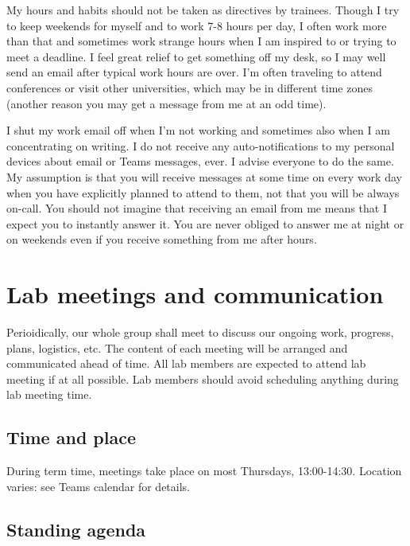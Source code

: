 \documentclass[
  12pt,
]{book}
\begin{document}
My hours and habits should not be taken as directives by trainees. Though I try to keep weekends for myself and to work 7-8 hours per day, I often work more than that and sometimes work strange hours when I am inspired to or trying to meet a deadline. I feel great relief to get something off my desk, so I may well send an email after typical work hours are over. I'm often traveling to attend conferences or visit other universities, which may be in different time zones (another reason you may get a message from me at an odd time).

I shut my work email off when I'm not working and sometimes also when I am concentrating on writing. I do not receive any auto-notifications to my personal devices about email or Teams messages, ever. I advise everyone to do the same. My assumption is that you will receive messages at some time on every work day when you have explicitly planned to attend to them, not that you will be always on-call. You should not imagine that receiving an email from me means that I expect you to instantly answer it. You are never obliged to answer me at night or on weekends even if you receive something from me after hours.

\chapter{Lab meetings and communication}\label{lab-meetings-and-communication}

Perioidically, our whole group shall meet to discuss our ongoing work, progress, plans, logistics, etc. The content of each meeting will be arranged and communicated ahead of time. All lab members are expected to attend lab meeting if at all possible. Lab members should avoid scheduling anything during lab meeting time.

\section{Time and place}\label{time-and-place}

During term time, meetings take place on most Thursdays, 13:00-14:30. Location varies: see Teams calendar for details.

\section{Standing agenda}\label{standing-agenda}
\end{document}
